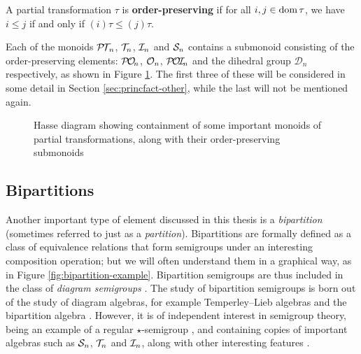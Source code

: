 \begin{definition}
  \label{def:order-preserving}
  A partial transformation $\tau$ is \textbf{order-preserving} if for all
  $i,j \in \operatorname{dom}\tau$, we have $i \leq j$ if and only if $(i)\tau \leq (j)\tau$.
\end{definition}

Each of the monoids $\mathcal{P\!T\!}_n$, $\mathcal{T}_n$, $\mathcal{I}_n$ and $\mathcal{S}_n$ contains a submonoid
consisting of the order-preserving elements: $\mathcal{P\!O\!}_n$, $\mathcal{O}_n$, $\mathcal{P\!O\!I\!}_n$ and the
dihedral group $\mathcal{D}_n$ respectively, as shown in Figure
\ref{fig:ord-pres}.  The first three of these will be considered in some detail
in Section \ref{sec:princfact-other}, while the last will not be mentioned
again.

\begin{figure}[ht]
  \centering
  \caption[Important monoids of partial transformations]{Hasse diagram showing
    containment of some important monoids of partial transformations, along with
    their order-preserving submonoids}
  \label{fig:ord-pres}
\end{figure}

\subsection{Bipartitions}
\label{sec:bipartitions}

Another important type of element discussed in this thesis is a
\textit{bipartition} (sometimes referred to just as a \textit{partition}).
Bipartitions are formally defined as a class of equivalence relations that form
semigroups under an interesting composition operation; but we will often
understand them in a graphical way, as in Figure \ref{fig:bipartition-example}.
Bipartition semigroups are thus included in the class of \textit{diagram
  semigroups} \cite{diagram_semigroups}.  The study of bipartition semigroups is
born out of the study of diagram algebras, for example Temperley--Lieb algebras
and the bipartition algebra \cite{partition_algebra}.  However, it is of
independent interest in semigroup theory, being an example of a regular
$\star$-semigroup \cite{reg_star_smgp}, and containing copies of important
algebras such as $\mathcal{S}_n$, $\mathcal{T}_n$ and $\mathcal{I}_n$, along with other interesting
features \cite[\S1]{deg_motzkin}.

